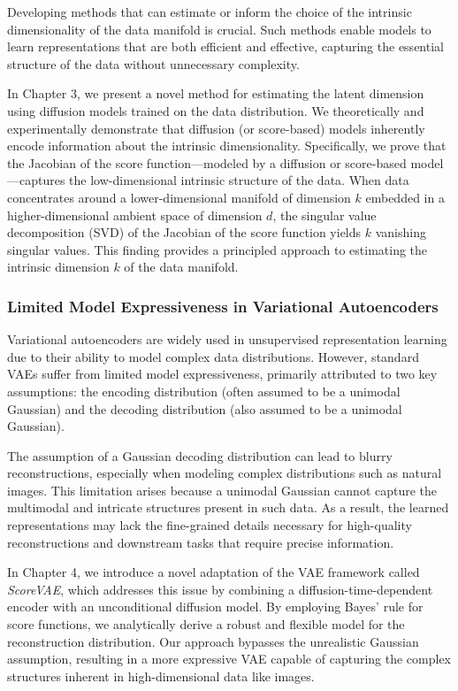 Developing methods that can estimate or inform the choice of the intrinsic dimensionality of the data manifold is crucial. Such methods enable models to learn representations that are both efficient and effective, capturing the essential structure of the data without unnecessary complexity.

In Chapter 3, we present a novel method for estimating the latent dimension using diffusion models trained on the data distribution. We theoretically and experimentally demonstrate that diffusion (or score-based) models inherently encode information about the intrinsic dimensionality. Specifically, we prove that the Jacobian of the score function—modeled by a diffusion or score-based model—captures the low-dimensional intrinsic structure of the data. When data concentrates around a lower-dimensional manifold of dimension \( k \) embedded in a higher-dimensional ambient space of dimension \( d \), the singular value decomposition (SVD) of the Jacobian of the score function yields \( k \) vanishing singular values. This finding provides a principled approach to estimating the intrinsic dimension \( k \) of the data manifold.

\subsubsection{Limited Model Expressiveness in Variational Autoencoders}

Variational autoencoders are widely used in unsupervised representation learning due to their ability to model complex data distributions. However, standard VAEs suffer from limited model expressiveness, primarily attributed to two key assumptions: the encoding distribution (often assumed to be a unimodal Gaussian) and the decoding distribution (also assumed to be a unimodal Gaussian).

The assumption of a Gaussian decoding distribution can lead to blurry reconstructions, especially when modeling complex distributions such as natural images. This limitation arises because a unimodal Gaussian cannot capture the multimodal and intricate structures present in such data. As a result, the learned representations may lack the fine-grained details necessary for high-quality reconstructions and downstream tasks that require precise information.

In Chapter 4, we introduce a novel adaptation of the VAE framework called \textit{ScoreVAE}, which addresses this issue by combining a diffusion-time-dependent encoder with an unconditional diffusion model. By employing Bayes' rule for score functions, we analytically derive a robust and flexible model for the reconstruction distribution. Our approach bypasses the unrealistic Gaussian assumption, resulting in a more expressive VAE capable of capturing the complex structures inherent in high-dimensional data like images.


